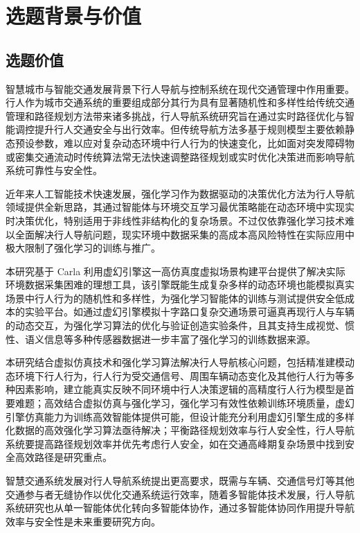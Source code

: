 \chapter{选题背景与价值}

\section{选题价值}

智慧城市与智能交通发展背景下行人导航与控制系统在现代交通管理中作用重要。行人作为城市交通系统的重要组成部分其行为具有显著随机性和多样性给传统交通管理和路径规划方法带来诸多挑战，行人导航系统研究旨在通过实时路径优化与智能调控提升行人交通安全与出行效率。但传统导航方法多基于规则模型主要依赖静态预设参数，难以应对复杂动态环境中行人行为的快速变化，比如面对突发障碍物或密集交通流动时传统算法常无法快速调整路径规划或实时优化决策进而影响导航系统可靠性与安全性。

近年来人工智能技术快速发展，强化学习作为数据驱动的决策优化方法为行人导航领域提供全新思路，其通过智能体与环境交互学习最优策略能在动态环境中实现实时决策优化，特别适用于非线性非结构化的复杂场景。不过仅依靠强化学习技术难以全面解决行人导航问题，现实环境中数据采集的高成本高风险特性在实际应用中极大限制了强化学习的训练与推广。

本研究基于 Carla 利用虚幻引擎这一高仿真度虚拟场景构建平台提供了解决实际环境数据采集困难的理想工具，该引擎既能生成复杂多样的动态环境也能模拟真实场景中行人行为的随机性和多样性，为强化学习智能体的训练与测试提供安全低成本的实验平台。如通过虚幻引擎模拟十字路口复杂交通场景可逼真再现行人与车辆的动态交互，为强化学习算法的优化与验证创造实验条件，且其支持生成视觉、惯性、语义信息等多种传感器数据进一步丰富了强化学习的训练数据来源。

本研究结合虚拟仿真技术和强化学习算法解决行人导航核心问题，包括精准建模动态环境下行人行为，行人行为受交通信号、周围车辆动态变化及其他行人行为等多种因素影响，建立能真实反映不同环境中行人决策逻辑的高精度行人行为模型是首要难题；高效结合虚拟仿真与强化学习，强化学习有效性依赖训练环境质量，虚幻引擎仿真能力为训练高效智能体提供可能，但设计能充分利用虚幻引擎生成的多样化数据的高效强化学习算法亟待解决；平衡路径规划效率与行人安全性，行人导航系统要提高路径规划效率并优先考虑行人安全，如在交通高峰期复杂场景中找到安全高效路径是研究重点。

智慧交通系统发展对行人导航系统提出更高要求，既需与车辆、交通信号灯等其他交通参与者无缝协作以优化交通系统运行效率，随着多智能体技术发展，行人导航系统研究也从单一智能体优化转向多智能体协作，通过多智能体协同作用提升导航效率与安全性是未来重要研究方向。

